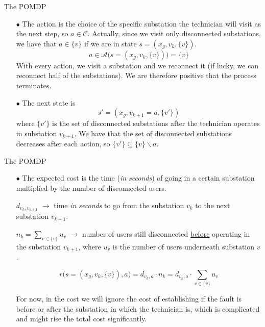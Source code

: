 \documentclass[10pt, aspectratio=169, compress, protectframetitle, handout]{beamer}
\begin{document}
\begin{frame}{The POMDP}

    \begin{itemize}
        \item[\alert{$\bullet$}] The \alert{action} is the choice of the specific substation the technician will visit as the next step, so $a \in \mathcal C$. Actually, since we visit only disconnected substations, we have that $a \in \{v\}$ if we are in state $s = (x_g, v_k, \{v\})$.
        \begin{equation*}
            a \in \mathcal A \big( s = (x_g, v_k, \{v\}) \big) = \{v\}
        \end{equation*}
        With every action, we visit a substation and we reconnect it (if lucky, we can reconnect half of the substations). We are therefore positive that the process terminates.
        
        \item[\alert{$\bullet$}] The \alert{next state} is
        \begin{equation*}
            s' = (x_g, v_{k+1} = a, \{v'\})
        \end{equation*}
        where $\{v'\}$ is the set of disconnected substations after the technician operates in substation $v_{k+1}$. We have that the set of disconnected substations decreases after each action, so $\{v'\} \subseteq \{v\} \backslash a$.
    \end{itemize}
    
\end{frame}

\begin{frame}{The POMDP}

    \begin{itemize}
        \item[\alert{$\bullet$}] The \alert{expected cost} is the time (\textit{in seconds}) of going in a certain substation multiplied by the number of disconnected users.
        \medskip
        
        $d_{v_k, v_{k+1}}$ $\longrightarrow$ time \textit{in seconds} to go from the substation $v_k$ to the next substation $v_{k+1}$.
        \medskip
        
        $n_{k} = \sum_{v \in \{v\}} u_v$ $\longrightarrow$ number of users still disconnected \underline{before} operating in the substation $v_{k+1}$, where $u_v$ is the number of users underneath substation $v$.
        \medskip
        
        \begin{equation*}
            r \Big( s = (x_g, v_k, \{v\}), a \Big) = d_{v_k, a} \cdot n_{k} = d_{v_k, a} \cdot \sum_{v \in \{v\}} u_v
        \end{equation*}
        \smallskip

        For now, in the cost we will ignore the cost of establishing if the fault is before or after the substation in which the technician is, which is complicated and might rise the total cost significantly.
    \end{itemize}
    
\end{frame}
\end{document}

